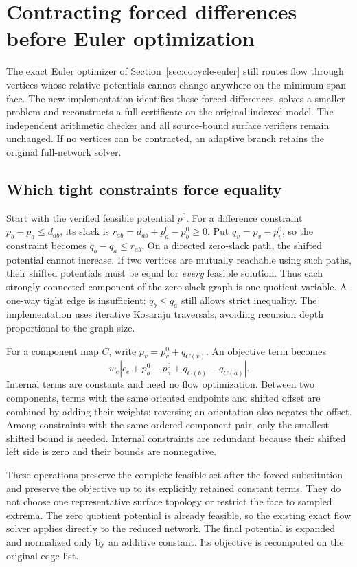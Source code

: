 \section{Contracting forced differences before Euler optimization}
\label{sec:cocycle-quotient}

The exact Euler optimizer of Section~\ref{sec:cocycle-euler} still routes
flow through vertices whose relative potentials cannot change anywhere on
the minimum-span face. The new implementation identifies these forced
differences, solves a smaller problem and reconstructs a full certificate
on the original indexed model. The independent arithmetic checker and all
source-bound surface verifiers remain unchanged. If no vertices can be
contracted, an adaptive branch retains the original full-network solver.

\subsection{Which tight constraints force equality}

Start with the verified feasible potential $p^0$. For a difference constraint
$p_b-p_a\leq d_{ab}$, its slack is
$r_{ab}=d_{ab}+p^0_a-p^0_b\geq0$. Put $q_v=p_v-p^0_v$, so the constraint becomes
$q_b-q_a\leq r_{ab}$. On a directed zero-slack path, the shifted potential
cannot increase. If two vertices are mutually reachable using such paths,
their shifted potentials must be equal for \emph{every} feasible solution.
Thus each strongly connected component of the zero-slack graph is one
quotient variable. A one-way tight edge is insufficient: $q_b\leq q_a$
still allows strict inequality. The implementation uses iterative Kosaraju
traversals, avoiding recursion depth proportional to the graph size.

For a component map $C$, write $p_v=p^0_v+q_{C(v)}$. An objective term becomes
\[
 w_e\left|c_e+p^0_b-p^0_a+q_{C(b)}-q_{C(a)}\right|.
\]
Internal terms are constants and need no flow optimization. Between two
components, terms with the same oriented endpoints and shifted offset are
combined by adding their weights; reversing an orientation also negates the
offset. Among constraints with the same ordered component pair, only the
smallest shifted bound is needed. Internal constraints are redundant because
their shifted left side is zero and their bounds are nonnegative.

These operations preserve the complete feasible set after the forced
substitution and preserve the objective up to its explicitly retained
constant terms. They do not choose one representative surface topology or
restrict the face to sampled extrema. The zero quotient potential is already
feasible, so the existing exact flow solver applies directly to the reduced
network. The final potential is expanded and normalized only by an additive
constant. Its objective is recomputed on the original edge list.

